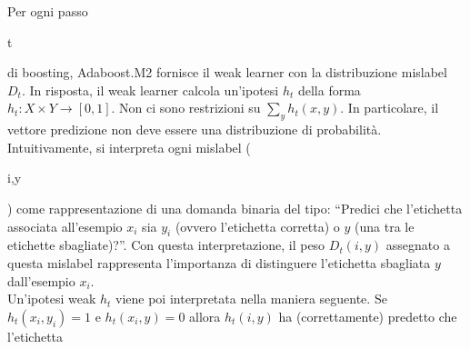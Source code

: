 Per ogni passo \begin{it}t\end{it} di boosting, Adaboost.M2 fornisce il weak learner con la distribuzione 
mislabel \begin{math}D_t\end{math}. In risposta, il weak learner calcola un'ipotesi \begin{math}h_t\end{math} della 
forma \begin{math}h_t : X \times Y \to \left[0,1\right]\end{math}. Non ci sono restrizioni su
 \begin{math}\sum_y h_t(x,y)\end{math}. In particolare, il vettore predizione non deve essere 
una distribuzione di probabilit\`a. \\
\newline
Intuitivamente, si interpreta ogni mislabel (\begin{it}i,y\end{it}) come rappresentazione di una domanda binaria
 del tipo: ``Predici che l'etichetta associata all'esempio \begin{math}x_i\end{math} sia \begin{math}y_i\end{math}
 (ovvero l'etichetta corretta) o \begin{math}y\end{math} (una tra le etichette sbagliate)?''. 
Con questa interpretazione, il peso \begin{math}D_t(i,y)\end{math} assegnato a questa mislabel rappresenta 
l'importanza di distinguere l'etichetta sbagliata \begin{math}y\end{math} dall'esempio \begin{math}x_i\end{math}.\\
\newline
Un'ipotesi weak \begin{math}h_t\end{math} viene poi interpretata nella maniera seguente. Se \begin{math}h_t(x_i,y_i)=1\end{math}
 e \begin{math}h_t(x_i,y)=0\end{math} allora \begin{math}h_t(i,y)\end{math} ha (correttamente) predetto che l'etichetta 
